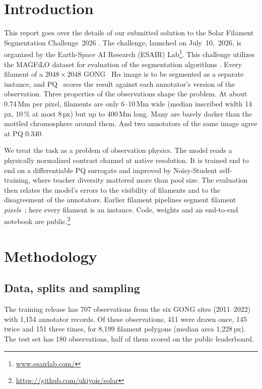 \documentclass[sigconf]{acmart}
\begin{document}
\section{Introduction}
    This report goes over the details of our submitted solution to the Solar Filament Segmentation Challenge~2026 \cite{filament-segmentation-2026}. The challenge, launched on July~10,~2026, is organized by the Earth-Space AI Research (ESAIR) Lab\footnote{\href{https://www.esairlab.com/home}{www.esairlab.com/}}. This challenge utilizes the MAGFiLO dataset for evaluation of the segmentation algorithms \cite{ahmadzadeh2024dataset}. Every filament of a $2048\times2048$ GONG~\cite{harvey1996gong} H$\alpha$ image is to be segmented as a separate instance, and PQ~\cite{kirillov2019panoptic} scores the result against each annotator's version of the observation. Three properties of the observations shape the problem. At about 0.74\,Mm per pixel, filaments are only 6--10\,Mm wide (median inscribed width 14\,px, 10\,\% at most 8\,px) but up to 400\,Mm long. Many are barely darker than the mottled chromosphere around them. And two annotators of the same image agree at PQ 0.340.

We treat the task as a problem of observation physics. The model reads a physically normalized contrast channel at native resolution. It is trained end to end on a differentiable PQ surrogate and improved by Noisy-Student self-training, where teacher diversity mattered more than pool size. The evaluation then relates the model's errors to the visibility of filaments and to the disagreement of the annotators. Earlier filament pipelines segment filament \emph{pixels}~\cite{ahmadzadeh2019filament,diercke2024filaments}; here every filament is an instance. Code, weights and an end-to-end notebook are public.\footnote{\url{https://github.com/ukiyois/solar}}

\section{Methodology}\label{sec:methodology}

\subsection{Data, splits and sampling}
The training release has 707 observations from the six GONG sites (2011--2022) with 1,154 annotator records. Of these observations, 411 were drawn once, 145 twice and 151 three times, for 8,199 filament polygons (median area 1,228\,px). The test set has 180 observations, half of them scored on the public leaderboard.
\end{document}
